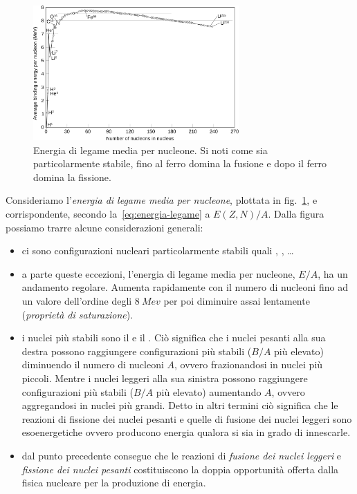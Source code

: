 \begin{figure}
    \centering
    \includegraphics[width=0.7\textwidth]{immagini/energia-legame.png}
    \caption{Energia di legame media per nucleone. Si noti come  sia particolarmente stabile, fino al ferro domina la fusione e dopo il ferro domina la fissione.}
    \label{fig:energia-legame}
\end{figure}

Consideriamo l'\emph{energia di legame media per nucleone}, plottata in fig.~\ref{fig:energia-legame}, e corrispondente, secondo la~\eqref{eq:energia-legame} a $E(Z,N) / A$. Dalla figura possiamo trarre alcune considerazioni generali:
\begin{itemize}
    \item ci sono configurazioni nucleari particolarmente stabili quali , ,  \dots
    \item a parte queste eccezioni, l’energia di legame media per nucleone, $E/A$, ha un andamento regolare. Aumenta rapidamente con il numero di nucleoni fino ad un valore dell’ordine degli $\SI{8}{Mev}$ per poi diminuire assai lentamente (\emph{proprietà di saturazione}).
    \item i nuclei più stabili sono il  e il . Ciò significa che i nuclei pesanti alla sua destra possono raggiungere configurazioni più stabili ($B/A$ più elevato) diminuendo il numero di nucleoni $A$, ovvero frazionandosi in nuclei più piccoli. Mentre i nuclei leggeri alla sua sinistra possono raggiungere configurazioni più stabili ($B/A$ più elevato) aumentando $A$, ovvero aggregandosi in nuclei più grandi. Detto in altri termini ciò significa che le reazioni di fissione dei nuclei pesanti e quelle di fusione dei nuclei leggeri sono esoenergetiche ovvero producono energia qualora si sia in grado di innescarle.
    \item dal punto precedente consegue che le reazioni di \emph{fusione dei nuclei leggeri} e \emph{fissione dei nuclei pesanti} costituiscono la doppia opportunità offerta dalla fisica nucleare per la produzione di energia.
\end{itemize}

